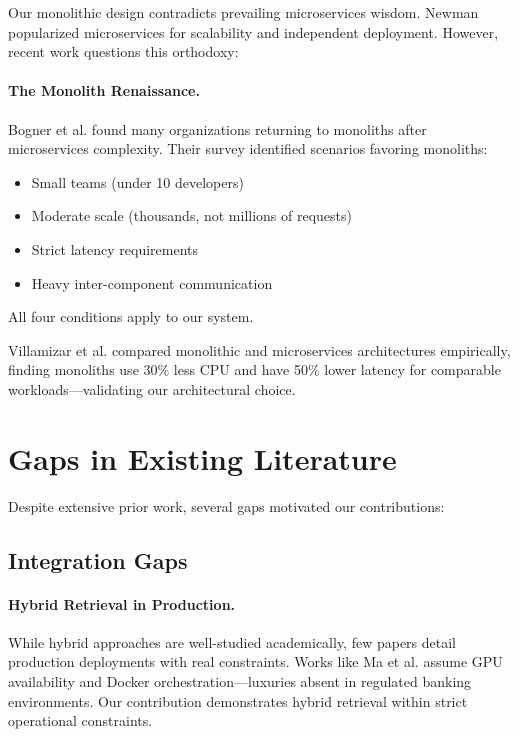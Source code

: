 Our monolithic design contradicts prevailing microservices wisdom. Newman \cite{newman2015building} popularized microservices for scalability and independent deployment. However, recent work questions this orthodoxy:

\paragraph{The Monolith Renaissance.} Bogner et al. \cite{bogner2019microservices} found many organizations returning to monoliths after microservices complexity. Their survey identified scenarios favoring monoliths:
\begin{itemize}[leftmargin=*,itemsep=2pt,topsep=2pt]
 \item Small teams (under 10 developers)
 \item Moderate scale (thousands, not millions of requests)
 \item Strict latency requirements
 \item Heavy inter-component communication
\end{itemize}
All four conditions apply to our system.

Villamizar et al. \cite{villamizar2015evaluating} compared monolithic and microservices architectures empirically, finding monoliths use 30\% less CPU and have 50\% lower latency for comparable workloads—validating our architectural choice.

\section{Gaps in Existing Literature}

Despite extensive prior work, several gaps motivated our contributions:

\subsection{Integration Gaps}

\paragraph{Hybrid Retrieval in Production.} While hybrid approaches are well-studied academically, few papers detail production deployments with real constraints. Works like Ma et al. \cite{ma2023fine} assume GPU availability and Docker orchestration—luxuries absent in regulated banking environments. Our contribution demonstrates hybrid retrieval within strict operational constraints.

